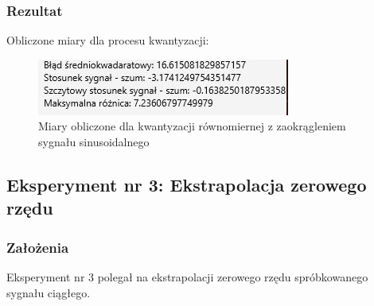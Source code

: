 \documentclass[12pt]{article}
\begin{document}
\subsubsection{Rezultat}
Obliczone miary dla procesu kwantyzacji:
\begin{figure}[H]
	\centering
	\includegraphics[width=\linewidth]{wyniki_kwantyzacja_z_zaokragleniem.jpg}
	\caption{Miary obliczone dla kwantyzacji równomiernej z zaokrągleniem sygnału sinusoidalnego}
	\label{Wartości dla eksperymentu 2}
\end{figure}



\newpage
\subsection{Eksperyment nr 3: Ekstrapolacja zerowego rzędu}


\subsubsection{Założenia}
Eksperyment nr 3 polegał na ekstrapolacji zerowego rzędu spróbkowanego sygnału ciągłego.
\end{document}

